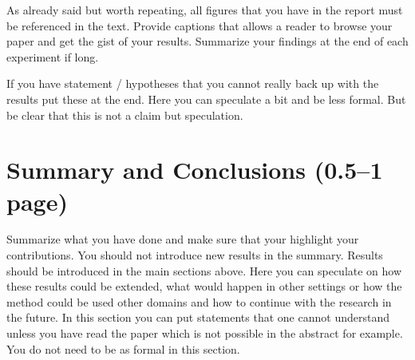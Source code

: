 \documentclass[a4paper,12pt]{article}
\begin{document}
As already said but worth repeating, all figures that you have in the
report must be referenced in the text. Provide captions that allows a
reader to browse your paper and get the gist of your
results. Summarize your findings at the end of each experiment if
long.

If you have statement / hypotheses that you cannot really back up with
the results put these at the end. Here you can speculate a bit and be
less formal.  But be clear that this is not a claim but speculation.

\section{Summary and Conclusions (0.5--1 page)}
\label{sec:summary}

Summarize what you have done and make sure that your highlight your
contributions. You should not introduce new results in the
summary. Results should be introduced in the main sections above. Here
you can speculate on how these results could be extended, what would
happen in other settings or how the method could be used other domains
and how to continue with the research in the future. In this section
you can put statements that one cannot understand unless you have read
the paper which is not possible in the abstract for example. You do
not need to be as formal in this section.





\end{document}
